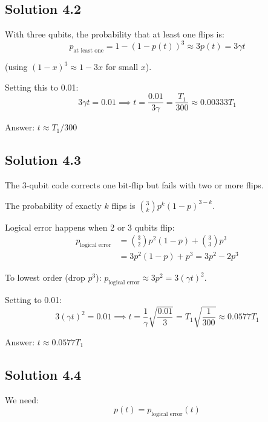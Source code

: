 \documentclass[11pt]{article}
\begin{document}
\subsection{Solution 4.2}

With three qubits, the probability that at least one flips is:
\begin{equation*}
    p_{\text{at least one}} = 1 - (1-p(t))^3 \approx 3p(t) = 3\gamma t
\end{equation*}

(using $(1-x)^3 \approx 1 - 3x$ for small $x$).

Setting this to 0.01:
\begin{equation*}
    3\gamma t = 0.01 \implies t = \frac{0.01}{3\gamma} = \frac{T_1}{300} \approx 0.00333 T_1
\end{equation*}

Answer: $t \approx T_1/300$

\subsection{Solution 4.3}

The 3-qubit code corrects one bit-flip but fails with two or more flips.

The probability of exactly $k$ flips is $\binom{3}{k} p^k (1-p)^{3-k}$.

Logical error happens when 2 or 3 qubits flip:
\begin{align*}
    p_{\text{logical error}} &= \binom{3}{2}p^2(1-p) + \binom{3}{3}p^3 \\
    &= 3p^2(1-p) + p^3 = 3p^2 - 2p^3
\end{align*}

To lowest order (drop $p^3$): $p_{\text{logical error}} \approx 3p^2 = 3(\gamma t)^2$.

Setting to 0.01:
\begin{equation*}
    3(\gamma t)^2 = 0.01 \implies t = \frac{1}{\gamma}\sqrt{\frac{0.01}{3}} = T_1 \sqrt{\frac{1}{300}} \approx 0.0577 T_1
\end{equation*}

Answer: $t \approx 0.0577 T_1$

\subsection{Solution 4.4}

We need:
\begin{equation*}
    p(t) = p_{\text{logical error}}(t)
\end{equation*}
\end{document}
